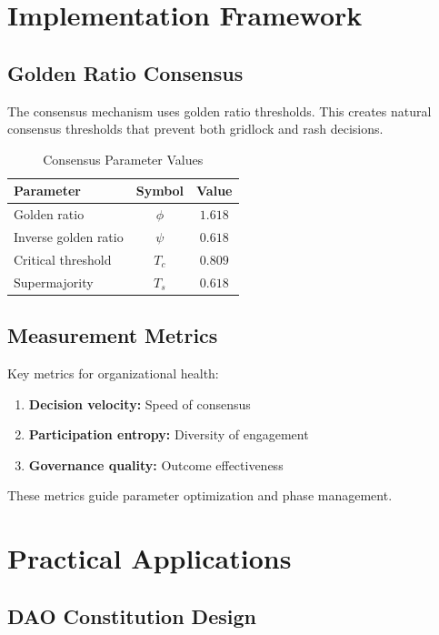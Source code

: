 \documentclass[AMA]{WileyNJD-AMA}
\begin{document}
\section{Implementation Framework}

\subsection{Golden Ratio Consensus}

The consensus mechanism uses golden ratio thresholds. This creates natural consensus thresholds that prevent both gridlock and rash decisions.

\begin{table}[h]
\caption{Consensus Parameter Values}
\label{tab:consensus}
\centering
\begin{tabular}{lcc}
\hline
Parameter & Symbol & Value \\
\hline
Golden ratio & $\phi$ & $1.618$ \\
Inverse golden ratio & $\psi$ & $0.618$ \\
Critical threshold & $T_c$ & $0.809$ \\
Supermajority & $T_s$ & $0.618$ \\
\hline
\end{tabular}
\end{table}

\subsection{Measurement Metrics}

Key metrics for organizational health:

\begin{enumerate}
    \item \textbf{Decision velocity:} Speed of consensus
    \item \textbf{Participation entropy:} Diversity of engagement
    \item \textbf{Governance quality:} Outcome effectiveness
\end{enumerate}

These metrics guide parameter optimization and phase management.

\section{Practical Applications}

\subsection{DAO Constitution Design}
\end{document}
